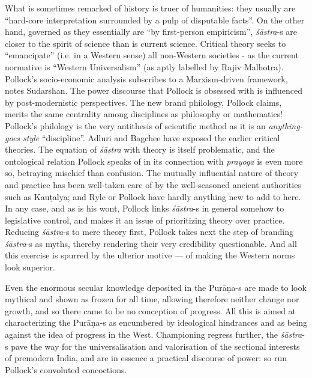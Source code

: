 What is sometimes remarked of history is truer of humanities: they usually are “hard-core interpretation surrounded by a pulp of disputable facts”. On the other hand, governed as they essentially are “by first-person empiricism”, {\sl śāstra}-s are closer to the spirit of science than is current science. Critical theory seeks to “emancipate” (i.e. in a Western sense) all non-Western societies - as the current normative is “Western Universalism” (as aptly labelled by Rajiv Malhotra). Pollock’s socio-economic analysis subscribes to a Marxism-driven framework, notes Sudarshan. The power discourse that Pollock is obsessed with is influenced by post-modernistic perspectives. The new brand philology, Pollock claims, merits the same centrality among disciplines as philosophy or mathematics! Pollock’s philology is the very antithesis of scientific method as it is an {\sl anything-goes style} “discipline”. Adluri and Bagchee have exposed the earlier critical theories. The equation of {\sl śāstra} with theory is itself problematic, and the ontological relation Pollock speaks of in its connection with {\sl prayoga} is even more so, betraying mischief than confusion. The mutually influential nature of theory and practice has been well-taken care of by the well-seasoned ancient authorities such as Kauṭalya; and Ryle or Pollock have hardly anything new to add to here. In any case, and as is his wont, Pollock links {\sl śāstra}-s in general somehow to legislative control, and makes it an issue of prioritizing theory over practice. Reducing {\sl śāstra}-s to mere theory first, Pollock takes next the step of branding {\sl śāstra}-s as myths, thereby rendering their very credibility questionable. And all this exercise is spurred by the ulterior motive --- of making the Western norms look superior.

Even the enormous secular knowledge deposited in the Purāṇa-s are made to look mythical and shown as frozen for all time, allowing therefore neither change nor growth, and so there came to be no conception of progress. All this is aimed at characterizing the \hbox{Purāṇa-s} as encumbered by ideological hindrances and as being against the idea of progress in the West. Championing regress further, the {\sl śāstra}-s pave the way for the universalisation and valorisation of the sectional interests of premodern India, and are in essence a practical discourse of power: so run Pollock’s convoluted concoctions.

